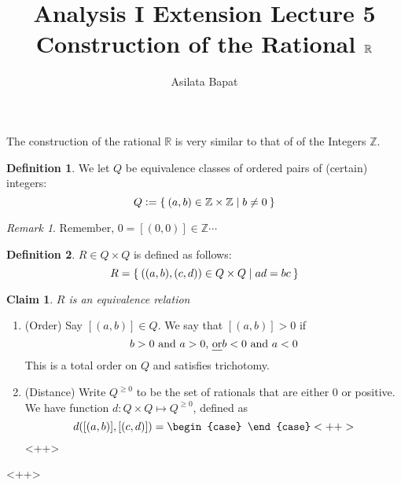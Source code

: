 \documentclass[12pt]{amsart}
\title{Analysis I Extension Lecture 5\\Construction of the Rational $\bbR$}
\author{Asilata Bapat}
\newcommand{\bbR}{\mathbb{R}}
\newcommand{\bbZ}{\mathbb{Z}}
\theoremstyle{plain}
\newtheorem*{claim}{Claim}
\theoremstyle{remark}
\newtheorem*{rmk}{Remark}
\theoremstyle{definition}
\newtheorem*{define}{Definition}
\begin{document}
\maketitle
{}

The construction of the rational $\bbR$ is very similar to that of of the Integers $\bbZ$.
\begin{define}
	We let $Q$ be equivalence classes of ordered pairs of (certain) integers:
	\begin{equation*}
		Q \vcentcolon = \Set{(a,b) \in \bbZ \times \bbZ | b \neq 0}
	\end{equation*}
\end{define}

\begin{rmk}
	Remember, $0 = [(0,0)] \in \bbZ\cdots$
\end{rmk}

\begin{define}
	$R\in Q \times Q$ is defined as follows:
	\begin{equation*}
		R = \Set{((a,b), (c,d)) \in Q \times Q | ad = bc}
	\end{equation*}
\end{define}
\begin{claim}
	$R$ is an equivalence relation
\end{claim}

\begin{enumerate}[(1)]
	\item (Order)
		Say $[(a,b)]\in Q$. We say that $[(a,b)] > 0$ if 
		\begin{equation*}
			b > 0 \mbox{ and } a > 0 \mbox{, \ul{or}} b < 0 \mbox{ and } a < 0
		\end{equation*}
		This is a total order on $Q$ and satisfies trichotomy.
	\item (Distance)
		Write $Q^{\geq 0}$ to be the set of rationals that are either $0$ or positive. We have  function $d: Q \times Q \mapsto Q^{\geq 0}$, defined as 
		\begin{equation*}
			d([(a,b)],[(c,d)]) = 
			\begin{case}
				
			\end{case}<++>
		\end{equation*}<++>
\end{enumerate}<++>
\end{document}
